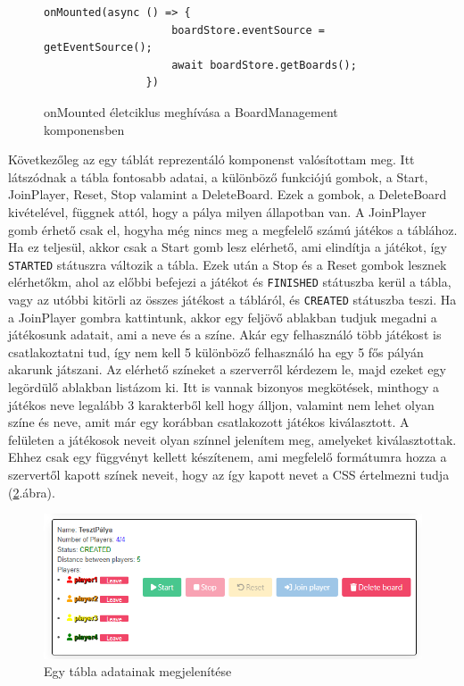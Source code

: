 \documentclass[a4paper,twoside]{article}
\begin{document}
\begin{figure}
	\caption{onMounted életciklus meghívása a BoardManagement komponensben}
	
		\begin{minipage}{\textwidth}
			\begin{lstlisting}[style=javascriptStyle]
				onMounted(async () => {
					boardStore.eventSource = getEventSource();
					await boardStore.getBoards();
				})
			\end{lstlisting}
		\end{minipage}
	
	\label{onMounted}
\end{figure}
\FloatBarrier

Következőleg az egy táblát reprezentáló komponenst valósítottam meg. Itt látszódnak a tábla
fontosabb adatai, a különböző funkciójú gombok, a Start, JoinPlayer, Reset, Stop valamint a DeleteBoard. Ezek a gombok, a DeleteBoard kivételével, függnek attól, hogy a pálya milyen állapotban van. A JoinPlayer gomb érhető csak el, hogyha még nincs meg a megfelelő számú játékos a táblához. Ha ez teljesül, akkor csak a Start gomb lesz elérhető, ami elindítja a játékot, így \verb|STARTED| státuszra változik a tábla. Ezek után a Stop és a Reset gombok lesznek elérhetőkm, ahol az előbbi befejezi a játékot és \verb|FINISHED| státuszba kerül a tábla, vagy az utóbbi kitörli az összes játékost a tábláról, és \verb|CREATED| státuszba teszi. Ha a JoinPlayer gombra kattintunk, akkor egy feljövő ablakban tudjuk megadni a játékosunk adatait, ami a neve és a színe. Akár egy felhasználó több játékost is csatlakoztatni tud, így nem kell 5 különböző felhasználó ha egy 5 fős pályán akarunk játszani. Az elérhető színeket a szerverről kérdezem le, majd ezeket egy legördülő ablakban listázom ki. Itt is vannak bizonyos megkötések, minthogy a játékos neve legalább 3 karakterből kell hogy álljon, valamint nem lehet olyan színe és neve, amit már egy korábban csatlakozott játékos kiválasztott. A felületen a játékosok neveit olyan színnel jelenítem meg, amelyeket kiválasztottak. Ehhez csak egy függvényt kellett készítenem, ami megfelelő formátumra hozza a szervertől kapott színek neveit, hogy az így kapott nevet a CSS értelmezni tudja (\ref{board}.ábra). 

\begin{figure}
	\caption{Egy tábla adatainak megjelenítése}
	\label{board}
	\centering
	\includegraphics[scale=0.63]{board}
\end{figure}
\end{document}
